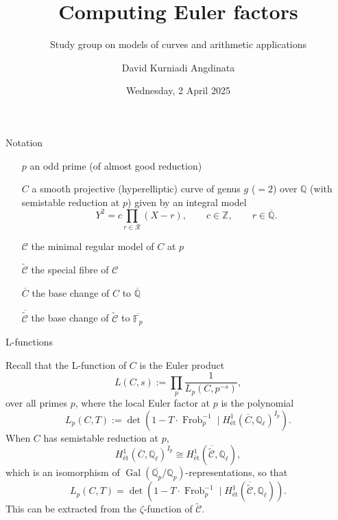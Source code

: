 \documentclass[10pt]{beamer}
\title{Computing Euler factors}
\subtitle{Study group on models of curves and arithmetic applications}
\author{David Kurniadi Angdinata}
\institute{London School of Geometry and Number Theory}
\date{Wednesday, 2 April 2025}
\begin{document}
\frame{\titlepage}

\begin{frame}{Notation}

\begin{itemize}
\item[$ p $] an odd prime (of almost good reduction)
\item[$ C $] a smooth projective (hyperelliptic) curve of genus $ g $ ($ = 2 $) over $ \mathbb{Q} $ (with semistable reduction at $ p $) given by an integral model
$$ Y^2 = c\prod_{r \in \mathcal{R}} (X - r), \qquad c \in \mathbb{Z}, \qquad r \in \overline{\mathbb{Q}}. $$
\item[$ \mathcal{C} $] the minimal regular model of $ C $ at $ p $
\item[$ \widetilde{\mathcal{C}} $] the special fibre of $ \mathcal{C} $
\item[$ \overline{C} $] the base change of $ C $ to $ \overline{\mathbb{Q}} $
\item[$ \overline{\widetilde{\mathcal{C}}} $] the base change of $ \widetilde{\mathcal{C}} $ to $ \overline{\mathbb{F}_p} $
\end{itemize}

\end{frame}

\begin{frame}[t]{L-functions}

Recall that the L-function of $ C $ is the Euler product
$$ L(C, s) := \prod_p \dfrac{1}{L_p(C, p^{-s})}, $$
over all primes $ p $, where the local Euler factor at $ p $ is the polynomial
$$ L_p(C, T) := \det(1 - T \cdot \operatorname{Frob}_p^{-1} \mid H_{\text{\'et}}^1(\overline{C}, \mathbb{Q}_\ell)^{I_p}). $$
When $ C $ has semistable reduction at $ p $,
$$ H_{\text{\'et}}^1(\overline{C}, \mathbb{Q}_\ell)^{I_p} \cong H_{\text{\'et}}^1(\overline{\widetilde{\mathcal{C}}}, \mathbb{Q}_\ell), $$
which is an isomorphism of $ \operatorname{Gal}(\overline{\mathbb{Q}_p} / \mathbb{Q}_p) $-representations, so that
$$ L_p(C, T) = \det(1 - T \cdot \operatorname{Frob}_p^{-1} \mid H_{\text{\'et}}^1(\overline{\widetilde{\mathcal{C}}}, \mathbb{Q}_\ell)). $$
This can be extracted from the $ \zeta $-function of $ \widetilde{\mathcal{C}} $.

\end{frame}
\end{document}

